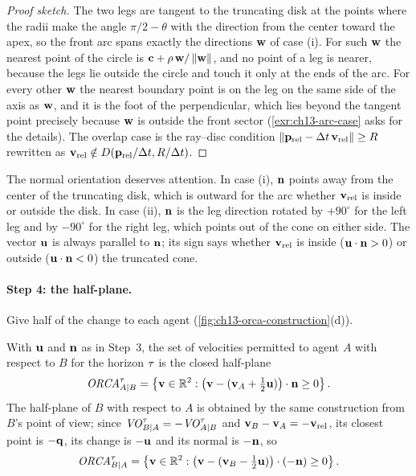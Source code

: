 \begin{proof}[Proof sketch]
The two legs are tangent to the truncating disk at the points where the
radii make the angle $\pi/2 - \theta$ with the direction from the center
toward the apex, so the front arc spans exactly the directions $\mathbf{w}$
of case (i). For such $\mathbf{w}$ the nearest point of the circle is
$\mathbf{c} + \rho\,\mathbf{w}/\left\lVert \mathbf{w} \right\rVert$, and no point of a leg is
nearer, because the legs lie outside the circle and touch it only at the
ends of the arc. For every other $\mathbf{w}$ the nearest boundary point is on
the leg on the same side of the axis as $\mathbf{w}$, and it is the foot of
the perpendicular, which lies beyond the tangent point precisely because
$\mathbf{w}$ is outside the front sector (\cref{exr:ch13-arc-case} asks for the
details). The overlap case is the ray--disc condition
$\left\lVert \mathbf{p}_{\mathrm{rel}} - \Delta t\,\mathbf{v}_{\mathrm{rel}} \right\rVert \ge R$ rewritten as
$\mathbf{v}_{\mathrm{rel}} \notin D(\mathbf{p}_{\mathrm{rel}}/\Delta t,R/\Delta t)$.
\end{proof}

The normal orientation deserves attention. In case (i), $\mathbf{n}$ points
away from the center of the truncating disk, which is outward for the arc
whether $\mathbf{v}_{\mathrm{rel}}$ is inside or outside the disk. In case (ii),
$\mathbf{n}$ is the leg direction rotated by $+90^\circ$ for the left leg and
by $-90^\circ$ for the right leg, which points out of the cone on either
side. The vector $\mathbf{u}$ is always parallel to $\mathbf{n}$; its sign says
whether $\mathbf{v}_{\mathrm{rel}}$ is inside ($\mathbf{u}\cdot\mathbf{n} > 0$) or
outside ($\mathbf{u}\cdot\mathbf{n} < 0$) the truncated cone.

\paragraph{Step 4: the half-plane.}
Give half of the change to each agent (\cref{fig:ch13-orca-construction}(d)).

\begin{definition}
\label{def:ch13-orca}
With $\mathbf{u}$ and $\mathbf{n}$ as in Step~3, the set of velocities permitted
to agent $A$ with respect to $B$ for the horizon $\tau$ is the closed
half-plane
\begin{equation}
  \mathit{ORCA}^{\tau}_{A|B} = \left\{ \mathbf{v} \in \mathbb{R}^2 : \bigl(\mathbf{v} - (\mathbf{v}_A + \tfrac12\mathbf{u})\bigr)\cdot\mathbf{n} \ge 0 \right\}.
  \label{eq:ch13-orca}
\end{equation}
The half-plane of $B$ with respect to $A$ is obtained by the same
construction from $B$'s point of view; since $\mathit{VO}^{\tau}_{B|A} =
-\mathit{VO}^{\tau}_{A|B}$ and $\mathbf{v}_B - \mathbf{v}_A = -\mathbf{v}_{\mathrm{rel}}$, its closest
point is $-\mathbf{q}$, its change is $-\mathbf{u}$ and its normal is
$-\mathbf{n}$, so
\begin{equation}
  \mathit{ORCA}^{\tau}_{B|A} = \left\{ \mathbf{v} \in \mathbb{R}^2 : \bigl(\mathbf{v} - (\mathbf{v}_B - \tfrac12\mathbf{u})\bigr)\cdot(-\mathbf{n}) \ge 0 \right\}.
  \label{eq:ch13-orca-mirror}
\end{equation}
\end{definition}

